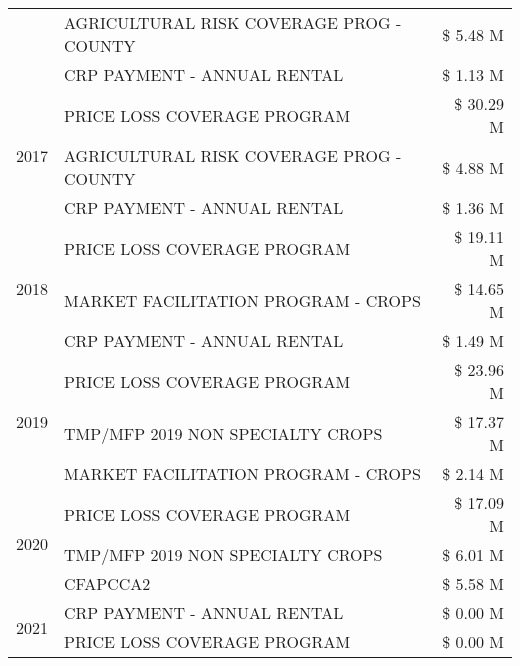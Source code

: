 \begin{tabular}{llr}
 & AGRICULTURAL RISK COVERAGE PROG - COUNTY      & \$ 5.48 M \\
 & CRP PAYMENT - ANNUAL RENTAL                   & \$ 1.13 M \\
\cline{1-3}
\multirow[t]{3}{*}{2017} & PRICE LOSS COVERAGE PROGRAM & \$ 30.29 M \\
 & AGRICULTURAL RISK COVERAGE PROG - COUNTY & \$ 4.88 M \\
 & CRP PAYMENT - ANNUAL RENTAL & \$ 1.36 M \\
\cline{1-3}
\multirow[t]{3}{*}{2018} & PRICE LOSS COVERAGE PROGRAM & \$ 19.11 M \\
 & MARKET FACILITATION PROGRAM - CROPS & \$ 14.65 M \\
 & CRP PAYMENT - ANNUAL RENTAL & \$ 1.49 M \\
\cline{1-3}
\multirow[t]{3}{*}{2019} & PRICE LOSS COVERAGE PROGRAM & \$ 23.96 M \\
 & TMP/MFP 2019 NON SPECIALTY CROPS & \$ 17.37 M \\
 & MARKET FACILITATION PROGRAM - CROPS & \$ 2.14 M \\
\cline{1-3}
\multirow[t]{3}{*}{2020} & PRICE LOSS COVERAGE PROGRAM & \$ 17.09 M \\
 & TMP/MFP 2019 NON SPECIALTY CROPS & \$ 6.01 M \\
 & CFAPCCA2 & \$ 5.58 M \\
\cline{1-3}
\multirow[t]{2}{*}{2021} & CRP PAYMENT - ANNUAL RENTAL & \$ 0.00 M \\
 & PRICE LOSS COVERAGE PROGRAM & \$ 0.00 M \\
\cline{1-3}
\bottomrule
\end{tabular}

